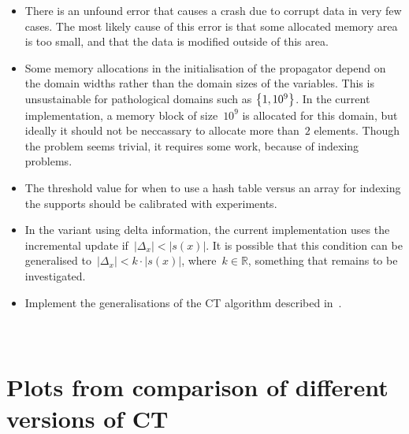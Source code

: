 \documentclass[a4paper,11pt]{article}
\newcommand{\Chapref}[1]{Section~\ref{#1}}
\numberwithin{equation}{section}
\begin{document}
\begin{itemize}
  \item There is an unfound error that causes a crash due to corrupt data 
    in very few cases.
    The most likely cause of this error is that some allocated memory area
    is too small, and that the data is modified outside of this area.
    
  \item Some memory allocations in the initialisation of the propagator
    depend on the domain widths rather
    than the domain sizes of the variables. This is unsustainable
    for pathological domains such as $\left\{1, 10^9\right\}$. In the current
    implementation, a memory block of size~$10^9$ is allocated for this
    domain, but ideally it should not be neccassary to allocate more than~$2$
    elements. Though the problem seems trivial, it requires some
    work, because of indexing problems.

  \item The threshold value for when to use a hash table versus
    an array for indexing the supports should be calibrated with
    experiments.

  \item In the variant using delta information, the current implementation
    uses the incremental update if~$|\Delta_x| < |s(x)|$. It is possible
    that this condition can be generalised to~$|\Delta_x| < k \cdot |s(x)|$,
    where~$k \in \mathbb{R}$, something that remains to be investigated.
    
  \item Implement the generalisations of the CT algorithm described
    in~\cite{DBLP:conf/aaai/VerhaegheLS17}.

\end{itemize}






\newpage
\appendix
\section{\\Plots from comparison of different versions of CT}
\label{app:compare-ct}
\end{document}
